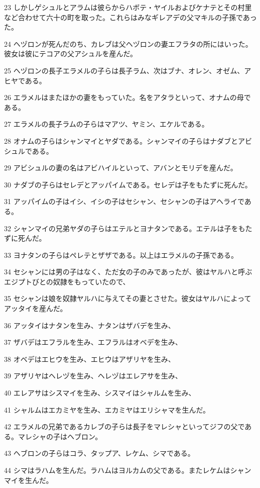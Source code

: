 \par 23 しかしゲシュルとアラムは彼らからハボテ・ヤイルおよびケナテとその村里など合わせて六十の町を取った。これらはみなギレアデの父マキルの子孫であった。
\par 24 ヘヅロンが死んだのち、カレブは父ヘヅロンの妻エフラタの所にはいった。彼女は彼にテコアの父アシュルを産んだ。
\par 25 ヘヅロンの長子エラメルの子らは長子ラム、次はブナ、オレン、オゼム、アヒヤである。
\par 26 エラメルはまたほかの妻をもっていた。名をアタラといって、オナムの母である。
\par 27 エラメルの長子ラムの子らはマアツ、ヤミン、エケルである。
\par 28 オナムの子らはシャンマイとヤダである。シャンマイの子らはナダブとアビシュルである。
\par 29 アビシュルの妻の名はアビハイルといって、アバンとモリデを産んだ。
\par 30 ナダブの子らはセレデとアッパイムである。セレデは子をもたずに死んだ。
\par 31 アッパイムの子はイシ、イシの子はセシャン、セシャンの子はアヘライである。
\par 32 シャンマイの兄弟ヤダの子らはエテルとヨナタンである。エテルは子をもたずに死んだ。
\par 33 ヨナタンの子らはペレテとザザである。以上はエラメルの子孫である。
\par 34 セシャンには男の子はなく、ただ女の子のみであったが、彼はヤルハと呼ぶエジプトびとの奴隷をもっていたので、
\par 35 セシャンは娘を奴隷ヤルハに与えてその妻とさせた。彼女はヤルハによってアッタイを産んだ。
\par 36 アッタイはナタンを生み、ナタンはザバデを生み、
\par 37 ザバデはエフラルを生み、エフラルはオベデを生み、
\par 38 オベデはエヒウを生み、エヒウはアザリヤを生み、
\par 39 アザリヤはヘレヅを生み、ヘレヅはエレアサを生み、
\par 40 エレアサはシスマイを生み、シスマイはシャルムを生み、
\par 41 シャルムはエカミヤを生み、エカミヤはエリシャマを生んだ。
\par 42 エラメルの兄弟であるカレブの子らは長子をマレシャといってジフの父である。マレシャの子はヘブロン。
\par 43 ヘブロンの子らはコラ、タップア、レケム、シマである。
\par 44 シマはラハムを生んだ。ラハムはヨルカムの父である。またレケムはシャンマイを生んだ。
